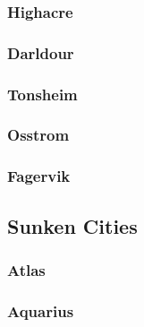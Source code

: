 		\subsubsection{Highacre}
	
		\subsubsection{Darldour}

		\subsubsection{Tonsheim}

		\subsubsection{Osstrom}

		\subsubsection{Fagervik}

	\subsection{Sunken Cities}

		\subsubsection{Atlas}

		\subsubsection{Aquarius}
